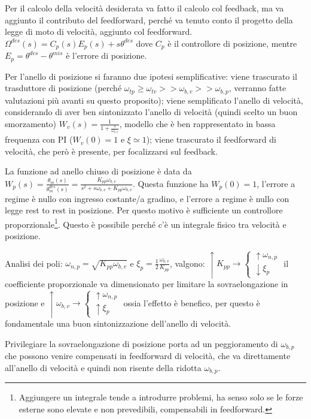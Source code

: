 Per il calcolo della velocità desiderata va fatto il calcolo col feedback, ma va aggiunto il contributo del feedforward, perché va tenuto conto il progetto della legge di moto di velocità, aggiunto col feedforward.
\(\Omega^{des}(s) = C_p(s)E_p(s) + s\theta^{des}\) dove \(C_p\) è il controllore di posizione, mentre \(E_p = \theta^{des} - \theta^{mis}\) è l'errore di posizione.


Per l'anello  di posizione si faranno due ipotesi semplificative: viene trascurato il trasduttore di posizione (perché \(\omega_{tp}\geqslant \omega_{tv} >> \omega_{b,v} >> \omega_{b,p}\), verranno fatte valutazioni più avanti su questo proposito); viene semplificato l'anello di velocità, considerando di aver ben sintonizzato l'anello di velocità (quindi scelto un buon smorzamento) \(W_v(s)=\frac{1}{1+\frac{s}{\omega_{b,v}}}\), modello che è ben rappresentato in bassa frequenza con PI (\(W_v(0)=1\) e \(\xi \simeq 1\)); viene trascurato il feedforward di velocità, che però è presente, per focalizzarsi sul feedback.


La funzione ad anello chiuso di posizione è data da \(W_p(s) = \frac{\theta_m(s)}{\theta_m^{des}(s)} = \frac{K_{pp}\omega_{b,v}}{s^2 + s \omega_{b,v} + K_{pp}\omega_{b,v}}\). Questa funzione ha \(W_p(0) = 1\), l'errore a regime è nullo con ingresso costante/a gradino, e l'errore a regime è nullo con legge rest to rest in posizione.
Per questo motivo è sufficiente un controllore proporzionale\footnote{Aggiungere un integrale tende a introdurre problemi, ha senso solo se le forze esterne sono elevate e non prevedibili, compensabili in feedforward.}. Questo è possibile perché c'è un integrale fisico tra velocità e posizione.

Analisi dei poli: \(\omega_{n,p} = \sqrt{K_{pp} \omega_{b,v}}\) e \(\xi_p = \frac{1}{2}\frac{\omega_{b,v}}{K_{pp}}\), valgono:
\( \uparrow K_{pp} \rightarrow \begin{cases}
    \uparrow \omega_{n,p} \\
    \downarrow \xi_p
\end{cases}
\) il coefficiente proporzionale va dimensionato per limitare la sovraelongazione in posizione e \( \uparrow \omega_{b,v} \rightarrow \begin{cases}
    \uparrow \omega_{n,p} \\
    \uparrow \xi_p
\end{cases}
\) ossia l'effetto è benefico, per questo è fondamentale una buon sintonizzazione dell'anello di velocità.

Privilegiare la sovraelongazione di posizione porta ad un peggioramento di \(\omega_{b,p}\) che possono venire compensati in feedforward di velocità, che va direttamente all'anello di velocità e quindi non risente della ridotta \(\omega_{b,p}\).


